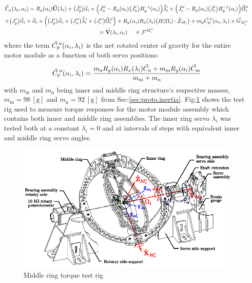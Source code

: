 \begin{multline} \label{eq:model-middle}
\vec{\Gamma}_\alpha(\lambda_i,\alpha_i)=R_y(\alpha_i)\vec{\mathbf{U}}(\lambda_i)+\big(\dot{J}_p'\big)\dot{\vec{\alpha}}_i+\Big(\dot{J}_n''-R_y(\alpha_i)\big(\dot{J}_n'\big)R_y^{-1}(\alpha_i)\Big)\dot{\vec{\lambda}}_i'+\Big(\dot{J}_r''-R_y(\alpha_i)\big(\dot{J}_r'\big)R_y^{-1}(\alpha_i)\Big)\vec{\Omega}_i''
\\
+\big(J_\text{p}'\big)\ddot{\vec{\alpha}}_i+\dot{\vec{\alpha}}_i\times \Big(\big(J_p'\big)\dot{\vec{\alpha}}_i+\big(J_n''\big)\dot{\vec{\lambda}}_i\hspace{-2pt}'+\big(J_r''\big)\vec{\Omega}_i\hspace{-2pt}''\Big)+R_y(\alpha_i)R_x(\lambda_i)\big(H(\Omega_i)\cdot\hat{Z}_{M_i}\big)+m_\text{p}\vec{C}_{\text{p}}\text{}\hspace{-2pt}''(\alpha_i,\lambda_i)\times\vec{G}_{M_i''}
\\
=\vec{\mathbf{V}}(\lambda_i,\alpha_i)~~~~\in\mathcal{F}^{M_i''}
\end{multline}
where the term $\vec{C}_{\text{p}}\text{}\hspace{-2pt}''(\alpha_i,\lambda_i)$ is the net rotated center of gravity for the entire motor module as a function of both servo positions:
\begin{equation}
\vec{C}_\text{p}\text{}\hspace{-2pt}''(\alpha_i,\lambda_i)=\frac{m_\text{n}R_y(\alpha_i)R_x(\lambda_i)\vec{C}_\text{n}+m_\text{m}R_y(\alpha_i)\vec{C}_\text{m}}{m_\text{m}+m_\text{n}}
\end{equation}
with $m_\text{m}$ and $m_\text{n}$ being inner and middle ring structure's respective masses, $m_\text{m}=98~[\text{g}]$ and $m_\text{n}=92~[\text{g}]$ from Sec:\ref{sec:proto.inertia}.
Fig:\ref{fig:torque-middle} shows the test rig used to measure torque responses for the motor module assembly which contains both inner and middle ring assemblies. The inner ring servo $\lambda_i$ was tested both at a constant $\lambda_i=0$ and at intervals of steps with equivalent inner and middle ring servo angles.
\par
\begin{figure}[htbp]
\centering
\includegraphics[width=\textwidth]{figs/torque-middle}
\vspace{-10pt}
\caption{Middle ring torque test rig}
\label{fig:torque-middle}
\vspace{-6pt}
\end{figure}
